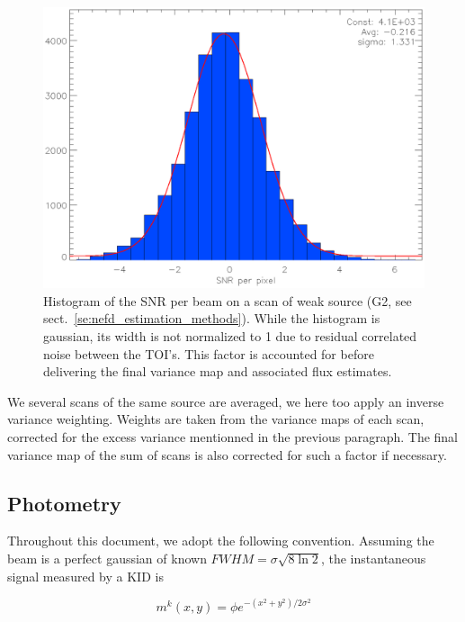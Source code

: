 \begin{figure}[hhh]
\begin{center}
\includegraphics[clip, angle=0, scale=1]{Figures/sigma_boost.eps}
\caption{Histogram of the SNR per beam on a scan of weak source (G2, see
  sect.~\ref{se:nefd_estimation_methods}). While the histogram is gaussian, its
  width is not normalized to 1 due to residual correlated noise between the
  TOI's. This factor is accounted for before delivering the final variance map
  and associated flux estimates.}
\label{fig:sigma_boost}
\end{center}
\end{figure}

We several scans of the same source are averaged, we here too apply an inverse
variance weighting. Weights are taken from the variance maps of each scan,
corrected for the excess variance mentionned in the previous paragraph. The
final variance map of the sum of scans is also corrected for such a factor if necessary.

\subsection{Photometry}
\label{se:photometry}

Throughout this document, we adopt the following convention. Assuming the beam
is a perfect gaussian of known $FWHM=\sigma\sqrt{8\ln 2}$, the instantaneous
signal measured by a KID is

\begin{equation}
m^k(x,y) = \phi e^{-(x^2+y^2)/2\sigma^2}
\label{eq:flux_per_beam_def}
\end{equation}

